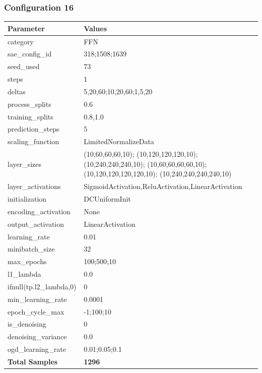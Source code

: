 \documentclass[a4paper,11pt,oneside]{article}
\theoremstyle{plain}
\theoremstyle{definition}
\begin{document}
	\newpage
	\subsubsection{Configuration 16}\label{config16}
	\begin{longtable}[H]{|p{0.3\linewidth}|p{0.7\linewidth}|} \hline 			\rowcolor{beaublue}\textbf{Parameter} &\textbf{Values} \\\hline{category} & {FFN} \\\hline
		{sae\_config\_id} & {318;1508;1639} \\\hline
		{seed\_used} & {73} \\\hline
		{steps} & {1} \\\hline
		{deltas} & {5,20,60;10,20,60;1,5,20} \\\hline
		{process\_splits} & {0.6} \\\hline
		{training\_splits} & {0.8,1.0} \\\hline
		{prediction\_steps} & {5} \\\hline
		{scaling\_function} & {LimitedNormalizeData} \\\hline
		{layer\_sizes} & {(10,60,60,60,10); (10,120,120,120,10); (10,240,240,240,10); (10,60,60,60,60,10); (10,120,120,120,120,10); (10,240,240,240,240,10)} \\\hline
		{layer\_activations} & {SigmoidActivation,ReluActivation,LinearActivation} \\\hline
		{initialization} & {DCUniformInit} \\\hline
		{encoding\_activation} & {None} \\\hline
		{output\_activation} & {LinearActivation} \\\hline
		{learning\_rate} & {0.01} \\\hline
		{minibatch\_size} & {32} \\\hline
		{max\_epochs} & {100;500;10} \\\hline
		{l1\_lambda} & {0.0} \\\hline
		{ifnull(tp.l2\_lambda,0)} & {0} \\\hline
		{min\_learning\_rate} & {0.0001} \\\hline
		{epoch\_cycle\_max} & {-1;100;10} \\\hline
		{is\_denoising} & {0} \\\hline
		{denoising\_variance} & {0.0} \\\hline
		{ogd\_learning\_rate} & {0.01;0.05;0.1} \\\hline
		{\textbf{Total Samples}} & {\textbf{1296}} \\\hline
	\end{longtable}
	
\end{document}
